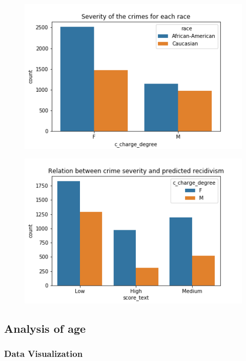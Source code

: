 \documentclass[11pt, fleqn, titlepage]{article}
\begin{document}
	\begin{figure}[H]
		\centering
		\includegraphics[width=0.5\linewidth]{imgs/c_charge_degree}
		\caption{}
		\label{fig:cchargedegree}
	\end{figure}
	
	\begin{figure}[H]
		\centering
		\includegraphics[width=0.5\linewidth]{imgs/charge_degree_score}
		\caption{}
		\label{fig:chargedegreescore}
	\end{figure}

	\subsection{Analysis of age}\label{analysis_of_age}
	
	\subsubsection{Data Visualization}\label{age_data_visualization}
	
\end{document}
